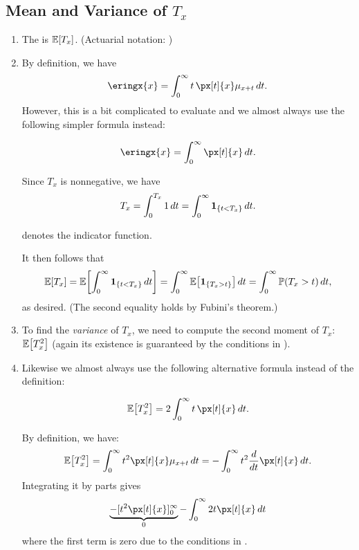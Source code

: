 \subsection{Mean and Variance of \(T_x\)}
\begin{enumerate}
\item The  is \(\mathbb{E}\qty[T_x]\). (Actuarial
notation: )


\item By definition, we have
\[
\eringx{x}=\int_{0}^{\infty}t\,\px[t]{x}\mu_{x+t}\,dt.
\]
However, this is a bit complicated to evaluate and we almost always use the
following simpler formula instead:
\begin{proposition}
\label{prp:eringx-fmla}
\[
\eringx{x}=\int_0^{\infty}\px[t]{x}\,dt.
\]
\end{proposition}

\begin{pf}
Since \(T_x\) is nonnegative, we have
\[
T_x=\int_{0}^{T_x}1\,dt
=\int_{0}^{\infty}\mathbf{1}_{\left\{t<T_x\right\}}\,dt.
\]
\begin{note}
 denotes the indicator function.
\end{note}

It then follows that
\[
\mathbb{E}\qty[T_x]=\mathbb{E}\qty[\int_{0}^{\infty}\mathbf{1}_{\left\{t<T_x\right\}}\,dt]
=\int_{0}^{\infty}\mathbb{E}\qty[\mathbf{1}_{\left\{T_x>t\right\}}]\,dt
=\int_{0}^{\infty}\mathbb{P}\qty(T_x>t)\,dt,
\]
as desired. (The second equality holds by Fubini's theorem.)
\end{pf}

\item To find the \emph{variance} of \(T_x\), we need to compute the second
moment of \(T_x\): \(\mathbb{E}\qty[T_x^2]\) (again its existence is guaranteed by the
conditions in ).
\item Likewise we almost always use the following alternative formula instead
of the definition:
\begin{proposition}
\label{prp:tx-2nd-moment-fmla}
\[
\expv{T_x^2}=2\int_{0}^{\infty}t\,\px[t]{x}\,dt.
\]
\end{proposition}
\begin{pf}
By definition, we have:
\[
\expv{T_x^2}=\int_{0}^{\infty}t^2\px[t]{x}\mu_{x+t}\,dt
=-\int_{0}^{\infty}t^2\frac{d}{dt}\px[t]{x}\,dt.
\]
Integrating it by parts gives
\[
\underbrace{-[t^2\px[t]{x}]_0^{\infty}}_{0}-\int_{0}^{\infty}2t\px[t]{x}\,dt
\]
where the first term is zero due to the conditions in
.
\end{pf}


\end{enumerate}
